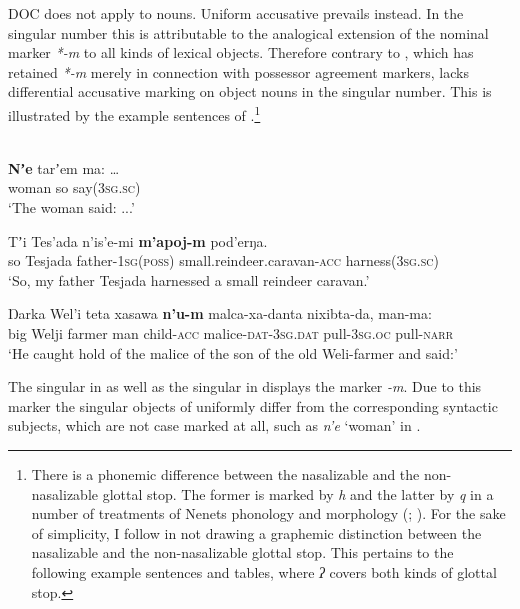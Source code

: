\documentclass[output=paper]{LSP/langsci}
\begin{document}
DOC does not apply to  nouns. 
Uniform accusative  prevails instead. In the singular number this is attributable to the analogical extension of the  nominal marker \textit{*-m} to all kinds of lexical objects. 
Therefore contrary to , which has retained \textit{*-m} merely in connection with possessor agreement markers,   lacks differential accusative marking on object nouns in the singular number. 
This is illustrated by the example sentences of .\footnote{There is a phonemic difference between the nasalizable and the non-nasalizable glottal stop. 
The former is marked by \textit{h} and the latter by \textit{q} in a number of treatments of Nenets phonology and morphology (\cf \ie \citealt[522--523]{Salminen1998Nenets}; \citealt[18--19]{Nikolaeva2014Grammar}). 
For the sake of simplicity, I follow \citet{Hajdu1988Samojedischen} in not drawing a graphemic distinction between the nasalizable and the non-nasalizable glottal stop. 
This pertains to the following example sentences and tables, where \textit{ʔ} covers both kinds of glottal stop.
}

\ea\label{12-wr-ex:11}%
\\

\ea \label{12-wr-ex:11a}
\gll \textbf{Nʼe}  tarʼem ma: …\\
 woman so say\textsc{(3sg.sc)}\\
\glt  ‘The woman said: ...’ 

\ex \label{12-wr-ex:11b}
\gll  Tʼi Tes’ada n’is’e-mi \textbf{m’apoj-m} pod’erŋa.\\
 so Tesjada father-\textsc{1sg(poss)} small.reindeer.caravan-\textsc{acc} harness\textsc{(3sg.sc)}\\
\glt  ‘So, my father Tesjada harnessed a small reindeer caravan.’

\ex  \label{12-wr-ex:11c}
\gll Ŋarka Wel’i teta xasawa \textbf{n’u-m} malca-xa-danta nixibta-da, man-ma:\\
 big Welji farmer man child\textsc{-acc} malice-\textsc{dat-3sg.dat} pull-\textsc{3sg.oc} pull-\textsc{narr}\\
\glt  ‘He caught hold of the malice of the son of the old Weli-farmer and said:’ 
\z
\z

The  singular  in  as well as the  singular  in  displays the  marker \textit{-m}. Due to this marker the singular objects of  uniformly differ from the corresponding syntactic subjects, which are not case marked at all, such as \textit{n’e} ‘woman’ in .
\end{document}
